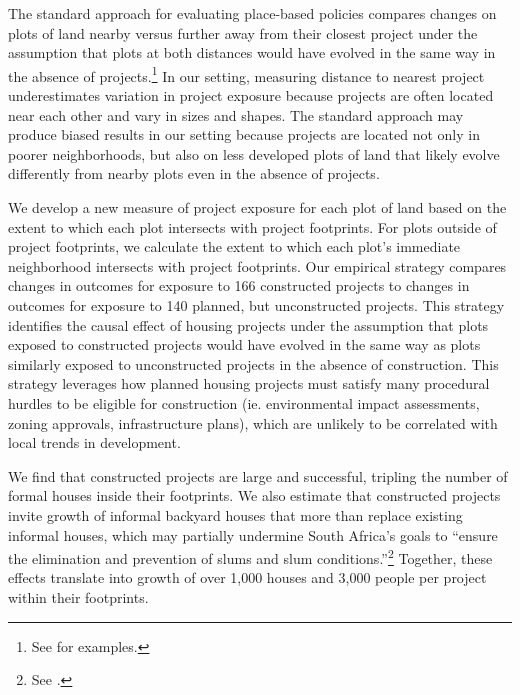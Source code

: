 \documentclass[12pt]{article}
\begin{document}
The standard approach for evaluating place-based policies compares changes on plots of land nearby versus further away from their closest project under the assumption that plots at both distances would have evolved in the same way in the absence of projects.\footnote{See \cite{diamond2016wants,rossi2010housing,hornbeck2017creative} for examples.}  In our setting, measuring distance to nearest project underestimates variation in project exposure because projects are often located near each other and vary in sizes and shapes.  The standard approach may produce biased results in our setting because projects are located not only in poorer neighborhoods, but also on less developed plots of land that likely evolve differently from nearby plots even in the absence of projects.

We develop a new measure of project exposure for each plot of land based on the extent to which each plot intersects with project footprints.  For plots outside of project footprints, we calculate the extent to which each plot's immediate neighborhood intersects with project footprints.  Our empirical strategy compares changes in outcomes for exposure to 166 constructed projects to changes in outcomes for exposure to 140 planned, but unconstructed projects.  This strategy identifies the causal effect of housing projects under the assumption that plots exposed to constructed projects would have evolved in the same way as plots similarly exposed to unconstructed projects in the absence of construction.  This strategy leverages how planned housing projects must satisfy many procedural hurdles to be eligible for construction (ie. environmental impact assessments, zoning approvals, infrastructure plans), which are unlikely to be correlated with local trends in development.

We find that constructed projects are large and successful, tripling the number of formal houses inside their footprints.  We also estimate that constructed projects invite growth of informal backyard houses that more than replace existing informal houses, which may partially undermine South Africa's goals to ``ensure the elimination and prevention of slums and slum conditions.''\footnote{See \cite{housingact}.}  Together, these effects translate into growth of over 1,000 houses and 3,000 people per project within their footprints.


\end{document}
